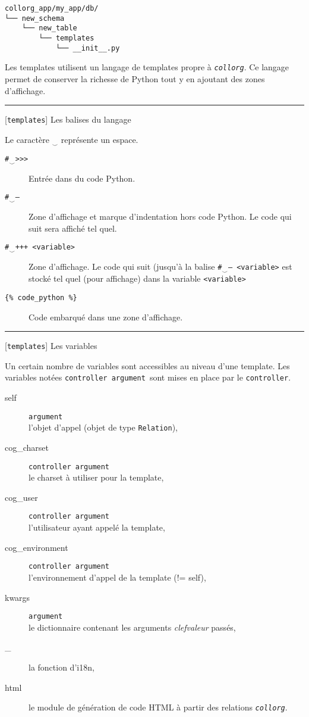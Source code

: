 \documentclass[a4paper]{letter}
\newcommand{\subsection}[2]{
\rule{0.5cm}{0.1pt} {\scriptsize [{#1}]} {#2}
}
\newcommand{\collorg}{\texttt{\textit{collorg}}}
\newcommand{\controller}{\texttt{controller}}
\newcommand{\templates}{\texttt{templates}}
\newcommand{\argument}{\texttt{argument}}
\newcommand{\ctrlarg}{\texttt{controller argument}}
\begin{document}
\begin{multicols}{3}
\begin{scriptsize}
\begin{verbatim}
collorg_app/my_app/db/
└── new_schema
    └── new_table
        └── templates
            └── __init__.py
\end{verbatim}
\end{scriptsize}


Les templates utilisent un langage de templates propre à \collorg. Ce langage permet de conserver la richesse de Python tout y en ajoutant des zones d'affichage.

\subsection{\templates}{Les balises du langage}

Le caractère $_{\smallsmile}$ représente un espace.
\begin{description}
\item[\texttt{\#$_{\smallsmile}$>>>}] Entrée dans du code Python.
\item[\texttt{\#$_{\smallsmile}$---}] Zone d'affichage et marque d'indentation hors code Python. Le code qui suit sera affiché tel quel.
\item[\texttt{\#$_{\smallsmile}$+++ <variable>}] Zone d'affichage. Le code qui suit (jusqu'à la balise \texttt{\#$_{\smallsmile}$--- <variable>} est stocké tel quel (pour affichage) dans la variable \texttt{<variable>}
\item[\texttt{\{\% code\_python \%\}}] Code embarqué dans une zone d'affichage.
\end{description}

\subsection{\templates}{Les variables}

Un certain nombre de variables sont accessibles au niveau d'une template. Les variables notées \ctrlarg\ sont mises en place par le \controller.

\begin{description}
\item[self] \argument\\ l'objet d'appel (objet de type \texttt{Relation}),
\item[cog\_charset] \ctrlarg\\ le charset à utiliser pour la template,
\item[cog\_user] \ctrlarg\\ l'utilisateur ayant appelé la template,
\item[cog\_environment] \ctrlarg\\ l'environnement d'appel de la template (!= self),
\item[kwargs] \argument\\ le dictionnaire contenant les arguments \textit{clefvaleur} passés,
\item[\_] la fonction d'i18n,
\item[html] le module de génération de code HTML à partir des relations \collorg.
\end{description}


\end{multicols}
\end{document}
